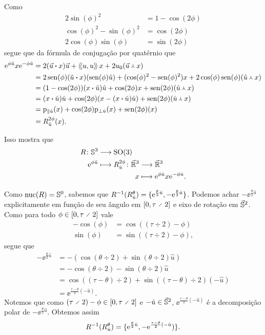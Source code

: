 Como
	\begin{align*}
	2\sin(\phi)^2 &= 1-\cos(2\phi) \\
	\cos(\phi)^2 - \sin(\phi)^2 &= \cos(2\phi) \\
	2\cos(\phi)\sin(\phi) &= \sin(2\phi)
	\end{align*}
segue que da fórmula de conjugação por quatérnio que
	\begin{align*}
	\ee^{\phi \hat{u}}x\ee^{-\phi \hat{u}} &= 2(\pesc{\vec{u}}{x})\vec{u} + \inteq{u}{u}x + 2\esc{u}(\pvec{\vec{u}}{x}) \\
		&= 2\sin(\phi)(\pesc{\hat{u}}{x})(\sin(\phi)\hat{u}) + (\cos(\phi)^2-\sin(\phi)^2)x + 2\cos(\phi)\sin(\phi)(\pvec{\hat{u}}{x}) \\
		&= (1-\cos(2\phi))(\pesc{x}{\hat{u}})\hat{u} + \cos(2\phi)x + \sin(2\phi)(\pvec{\hat{u}}{x}) \\
		&= (\pesc{x}{\hat{u}})\hat{u} + \cos(2\phi)(x-(\pesc{x}{\hat{u}})\hat{u}) + \sin(2\phi)(\pvec{\hat{u}}{x}) \\
		&= \proj_{\parallel \hat{u}}(x) + \cos(2\phi)\proj_{\perp \hat{u}}(x) + \sin(2\phi)(x) \\
		&= R^{2\phi}_{\hat{u}}(x).
	\end{align*}

Isso mostra que
	\begin{align*}
	\func{R}{\S^3}{\SO(3)}{\ee^{\phi \hat{u}}}{
		\begin{aligned}[t]
		\func{R^{2\phi}_{\hat{u}}}{\vec{\R}^3}{\vec{\R}^3}{x}{\ee^{\phi \hat{u}}x\ee^{-\phi \hat{u}}}.
		\end{aligned}
	}
	\end{align*}

Como $\nuc(R) = \S^0$, sabemos que $R\inv(R^{\theta}_{\hat{u}}) = \{\ee^{\frac{\theta}{2}\hat{u}},-\ee^{\frac{\theta}{2}\hat{u}}\}$. Podemos achar $-\ee^{\frac{\theta}{2}\hat{u}}$ explicitamente em função de seu ângulo em $\intff{0}{\tau \div 2}$ e eixo de rotação em $\vec{\S}^2$. Como para todo $\phi \in \intff{0}{\tau \div 2}$ vale
	\begin{align*}
	-\cos(\phi) &= \cos((\tau \div 2) - \phi) \\
	\sin(\phi) &= \sin((\tau \div 2) - \phi),
	\end{align*}
segue que
	\begin{align*}
	-\ee^{\frac{\theta}{2}\hat{u}} &= -(\cos(\theta \div 2) + \sin(\theta \div 2) \hat{u}) \\
		&= -\cos(\theta \div 2) - \sin(\theta \div 2) \hat{u} \\
		&= \cos((\tau-\theta) \div 2) + \sin((\tau - \theta) \div 2)(-\hat{u}) \\
		&= \ee^{\frac{\tau - \theta}{2}(-\hat{u})}.
	\end{align*}
Notemos que como $(\tau \div 2) - \phi \in \intff{0}{\tau \div 2}$ e $-\hat{u} \in \vec{\S}^2$, $\ee^{\frac{\tau - \theta}{2}(-\hat{u})}$ é a decomposição polar de $-\ee^{\frac{\theta}{2}\hat{u}}$. Obtemos assim
	\begin{equation*}
	R\inv(R^{\theta}_{\hat{u}}) = \{\ee^{\frac{\theta}{2}\hat{u}},-\ee^{\frac{\tau - \theta}{2}(-\hat{u}})\}.
	\end{equation*}

